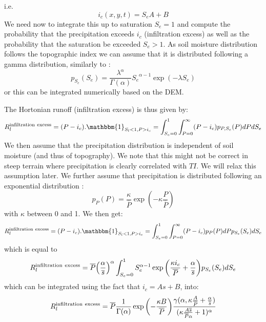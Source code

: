 \documentclass[twoside,10pt]{report}
\begin{document}
i.e.
\begin{equation}
    i_c(x,y,t) = S_e A + B
\end{equation}
We need now to integrate this up to saturation $S_e=1$ and compute the probability that the precipitation exceeds $i_c$ (infiltration excess) as well as the probability that the saturation be exceeded $S_e>1$. As soil moisture distribution follows the topographic index we can assume that it is distributed following a gamma distribution, similarly to \citet{Entekhabi89}:
\begin{equation}
    p_{S_e}(S_e) = \frac{\lambda^\alpha}{\Gamma(\alpha)} {S_e}^{\alpha -1} \exp{(-\lambda S_e)}
\end{equation}
or this can be integrated numerically based on the DEM.

The Hortonian runoff (infiltration excess) is thus given by:
\begin{equation}
     R_l^{\rm infiltration \ excess} =  (P-i_c).\mathbbm{1}_{S_l < 1, P>i_c} = \int_{S_e=0}^1 \int_{P=0}^\infty (P-i_c) p_{P,S_e}(P) dP dS_e
\end{equation}
We then assume that the precipitation distribution is independent of soil moisture (and thus of topography). We note that this might not be correct in steep terrain where precipitation is clearly correlated with $TI$. We will relax this assumption later. We further assume that precipitation is distributed following an exponential distribution \citep{Entekhabi89,Isham05}:
\begin{equation}
    p_{P}(P) = \frac{\kappa}{\overline P} \exp{ \left(-\kappa \frac{P}{\overline P}\right)} 
\end{equation}
with $\kappa$ between 0 and 1.
We then get:
\begin{equation}
     R_l^{\rm infiltration \ excess} =  (P-i_c).\mathbbm{1}_{S_l < 1, P>i_c} = \int_{S_e=0}^1 \int_{P=0}^\infty (P-i_c)  p_{P}(P)dP p_{S_e}(S_e)dS_e
\end{equation}
which is equal to 
\begin{equation}
     R_l^{\rm infiltration \ excess} =  \overline{P} {\left( \frac{\alpha}{\overline s}\right)}^\alpha \int_{S_e=0}^1  S_e^{\alpha -1}\exp{\left( \frac{\kappa i_c}{\overline{P}} + \frac{\alpha}{\overline s} \right)}   p_{S_e}(S_e)dS_e
\end{equation}
which can be integrated using the fact that $i_c=As+B$, into:
\begin{equation}
     R_l^{\rm infiltration \ excess} =  \overline{P}  \frac{1}{\Gamma(\alpha)} \exp{\left(-\frac{\kappa B}{\overline P}\right)} \frac{\gamma(\alpha, \kappa \frac{A}{\overline P} + \frac{\alpha}{\overline s} )}{ ( \kappa \frac{A\overline s}{\overline P \alpha}  + 1)^\alpha}
\end{equation}
\end{document}
